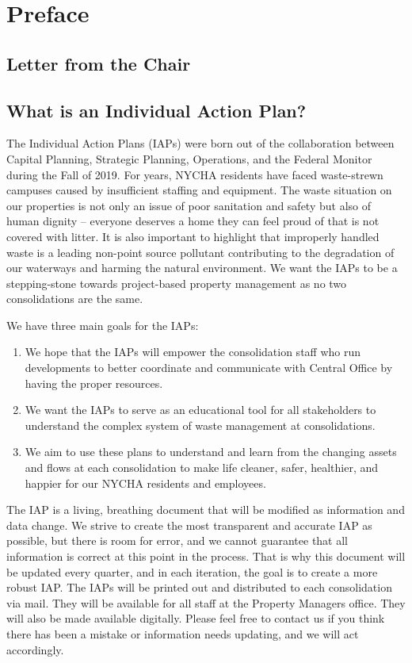 \chapter{Preface}

\section{Letter from the Chair}\label{sec:Section1}
\clearpage
{\selectfont
\section{What is an Individual Action Plan?}

The Individual Action Plans (IAPs) were born out of the collaboration between Capital Planning, Strategic Planning, Operations, and the Federal Monitor during the Fall of 2019. For years, NYCHA residents have faced waste-strewn campuses caused by insufficient staffing and equipment. The waste situation on our properties is not only an issue of poor sanitation and safety but also of human dignity -- everyone deserves a home they can feel proud of that is not covered with litter. It is also important to highlight that improperly handled waste is a leading non-point source pollutant contributing to the degradation of our waterways and harming the natural environment. We want the IAPs to be a stepping-stone towards project-based property management as no two consolidations are the same. 

We have three main goals for the IAPs: 
\begin{enumerate}
\item We hope that the IAPs will empower the consolidation staff who run developments to better coordinate and communicate with Central Office by having the proper resources. 
\item We want the IAPs to serve as an educational tool for all stakeholders to understand the complex system of waste management at consolidations. 
\item We aim to use these plans to understand and learn from the changing assets and flows at each consolidation to make life cleaner, safer, healthier, and happier for our NYCHA residents and employees. 
\end{enumerate}

The IAP is a living, breathing document that will be modified as information and data change. We strive to create the most transparent and accurate IAP as possible, but there is room for error, and we cannot guarantee that all information is correct at this point in the process. That is why this document will be updated every quarter, and in each iteration, the goal is to create a more robust IAP. The IAPs will be printed out and distributed to each consolidation via mail. They will be available for all staff at the Property Managers office. They will also be made available digitally. Please feel free to contact us if you think there has been a mistake or information needs updating, and we will act accordingly. 


}
